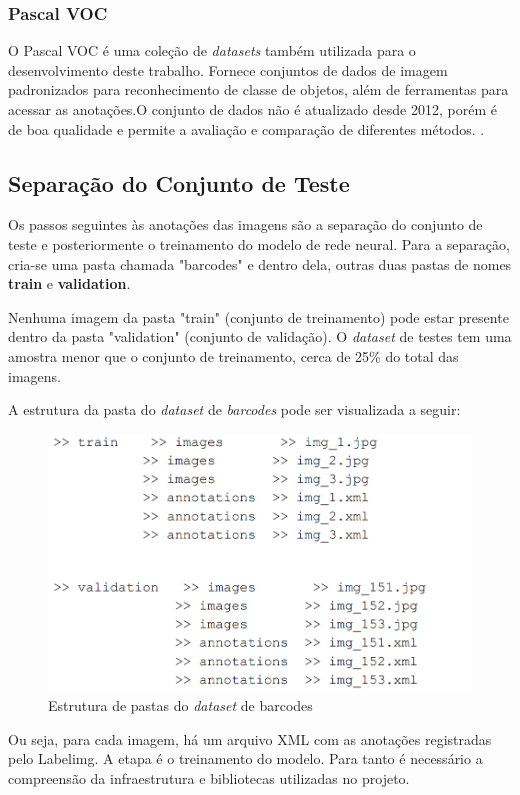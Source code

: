 \subsubsection*{Pascal VOC}
O Pascal VOC é uma coleção de \textit{datasets} também utilizada para o desenvolvimento deste trabalho. Fornece conjuntos de dados de imagem padronizados para reconhecimento de classe de objetos, além de ferramentas para acessar as anotações.O conjunto de dados não é atualizado desde 2012, porém é de boa qualidade e permite a avaliação e comparação de diferentes métodos. \cite{zhou2017application, everingham2010pascal}.


\subsection{Separação do Conjunto de Teste}

Os passos seguintes às anotações das imagens são a separação do conjunto de teste e posteriormente o treinamento do modelo de rede neural. Para a separação, cria-se uma pasta chamada "barcodes" e dentro dela, outras duas pastas de nomes \textbf{train} e \textbf{validation}.

Nenhuma imagem da pasta "train" (conjunto de treinamento) pode estar presente dentro da pasta "validation" (conjunto de validação). O \textit{dataset} de testes tem uma amostra menor que o conjunto de treinamento, cerca de 25\% do total das imagens.

A estrutura da pasta do \textit{dataset} de \textit{barcodes} pode ser visualizada a seguir:

\begin{figure}[H]
	\centering
	\includegraphics[width=0.5\linewidth]{figuras/MachineLearning/foldersDataset.png}
	\caption{Estrutura de pastas do \textit{dataset} de barcodes}
	\label{fig:labelimg}
\end{figure}

Ou seja, para cada imagem, há um arquivo XML com as anotações registradas pelo Labelimg. A etapa é o treinamento do modelo. Para tanto é necessário a compreensão da infraestrutura e bibliotecas utilizadas no projeto.

